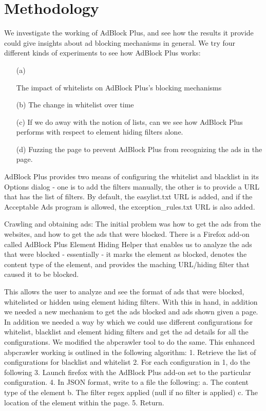 \section{Methodology}
We investigate the working of AdBlock Plus, and see how the results it provide could give insights about ad blocking mechanisms in general. We try four different kinds of experiments to see how AdBlock Plus works:
\begin{enumerate}
	\item[(a)] 

The impact of whitelists on AdBlock Plus's blocking mechanisms 
\item [(b)]
 The change in whitelist over time
\item[(c)]
 If we do away with the notion of lists, can we see how AdBlock Plus performs with respect to element hiding filters alone.
 \item[(d)] Fuzzing the page to prevent AdBlock Plus from recognizing the ads in the page.

\end{enumerate}

 AdBlock Plus provides two means of configuring the whitelist and blacklist in its Options dialog -  one is to add the filters manually, the other is to provide a URL that has the list of filters. By default, the easylist.txt URL is added, and if the Acceptable Ads program is allowed, the exception\_rules.txt URL is also added.


Crawling and obtaining ads: The initial problem was how to get the ads from the websites, and how to get the ads that were blocked. There is a Firefox add-on called AdBlock Plus Element Hiding Helper that enables us to analyze the ads that were blocked - essentially - it marks the element as blocked, denotes the content type of the element, and provides the maching URL/hiding filter that caused it to be blocked. 

This allows the user to analyze and see the format of ads that were blocked, whitelisted or hidden using element hiding filters. With this in hand, in addition we needed a new mechanism to get the ads blocked and ads shown given a page. In addition we needed a way by which we could use different configurations for whitelist, blacklist and element hiding filters and get the ad details for all the configurations. We modified the abpcrawler tool to do the same. This enhanced abpcrawler working is outlined in the following algorithm:
1. Retrieve the list of configurations for blacklist and whitelist
2. For each configuration in 1, do the following
3. Launch firefox with the AdBlock Plus add-on set to the particular configuration.
4. In JSON format, write to a file the following:
a. The content type of the element
b. The filter regex applied (null if no filter is applied)
c. The location of the element within the page.
5. Return.

